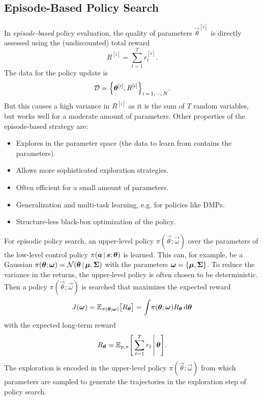 		\subsection{Episode-Based Policy Search}
			\label{subsec:episodeBasedPolicySearch}

			In \emph{episode-based} policy evaluation, the quality of parameters \( \vec{\theta}^{[i]} \) is directly assessed using the (undiscounted) total reward
			\begin{equation*}
				R^{[i]} = \sum_{t = 1}^{T} r_t^{[i]}.
			\end{equation*}
			The data for the policy update is
			\begin{equation*}
				\mathcal{D} = \Big\{ \bm{\theta}^{[i]}, R^{[i]} \Big\}_{i \,=\, 1,\,\cdots\!,\,N}.
			\end{equation*}
			But this causes a high variance in \( R^{[i]} \) as it is the sum of \(T\) random variables, but works well for a moderate amount of parameters. Other properties of the episode-based strategy are:
			\begin{itemize}
				\item Explores in the parameter space (the data to learn from contains the parameters).
				\item Allows more sophisticated exploration strategies.
				\item Often efficient for a small amount of parameters.
				\item Generalization and multi-task learning, e.g. for policies like DMPs.
				\item Structure-less black-box optimization of the policy.
			\end{itemize}

			For episodic policy search, an upper-level policy \( \pi(\vec{\theta}; \vec{\omega}) \) over the parameters of the low-level control policy \( \pi(\bm{a} \,\vert\, \bm{s}; \bm{\theta}) \) is learned. This can, for example, be a Gaussian \( \pi(\bm{\theta}; \bm{\omega}) = \mathcal{N}(\bm{\theta} \,\vert\, \bm{\mu}, \bm{\mathrm{\Sigma}}) \) with the parameters \( \bm{\omega} = \{ \bm{\mu}, \bm{\mathrm{\Sigma}} \} \). To reduce the variance in the returns, the upper-level policy is often chosen to be deterministic. Then a policy \( \pi(\vec{\theta}; \vec{\omega}) \) is searched that maximizes the expected reward
			\begin{equation}
				J(\bm{\omega})
					= \mathbb{E}_{\pi(\bm{\theta}; \bm{\omega})}\big[ R_{\bm{\theta}} \big]
					= \int\! \pi(\bm{\theta}; \bm{\omega}) R_{\bm{\theta}} \dd{\bm{\theta}}  \label{eq:upperLevelReward}
			\end{equation}
			with the expected long-term reward
			\begin{equation*}
				R_{\bm{\theta}} = \mathbb{E}_{p, \pi}\Bigg[ \sum_{t = 1}^{T} r_t \,\Bigg\vert\, \bm{\theta} \Bigg].
			\end{equation*}
			The exploration is encoded in the upper-level policy \( \pi(\vec{\theta}; \vec{\omega}) \) from which parameters are sampled to generate the trajectories in the exploration step of policy search.


